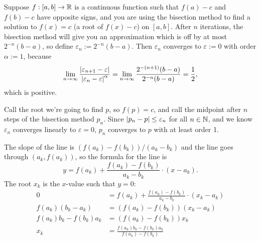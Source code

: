 \documentclass{article}
\begin{document}
\bigskip
\begin{prob}
\end{prob}
Suppose $f: [a,b] \rightarrow \mathbb{R}$ is a continuous function such that $f(a)-c$ and $f(b)-c$ have opposite signs, and you are using the bisection method to find a solution to $f(x)=c$ (a root of $f(x)-c$) on $[a,b]$. After $n$ iterations, the bisection method will give you an approximation which is off by at most $2^{-n}(b-a)$, so define $\varepsilon_n := 2^{-n}(b-a)$. Then $\varepsilon_n$ converges to $\varepsilon := 0$ with order $\alpha := 1$, because 
\[ \lim_{n \rightarrow \infty} \frac{\left\lvert \varepsilon_{n+1}-\varepsilon \right\rvert}{\left\lvert \varepsilon_n-\varepsilon \right\rvert^\alpha} = \lim_{n \rightarrow \infty} \frac{2^{-(n+1)}(b-a)}{2^{-n}(b-a)} = \frac{1}{2}, \]
which is positive.
\par
Call the root we're going to find $p$, so $f(p)=c$, and call the midpoint after $n$ steps of the bisection method $p_n$. Since $\left\lvert p_n-p \right\rvert \leq \varepsilon_n$ for all $n \in \mathbb{N}$, and we know $\varepsilon_n$ converges linearly to $\varepsilon=0$, $p_n$ converges to $p$ with at least order 1.

\bigskip
\begin{prob}
\end{prob}
The slope of the line is $(f(a_k) - f(b_k)) / (a_k - b_k)$ and the line goes through $(a_k, f(a_k))$, so the formula for the line is
\[ y = f(a_k) + \frac{f(a_k)-f(b_k)}{a_k-b_k} \cdot (x - a_k). \]
The root $x_k$ is the $x$-value such that $y=0$:
\begin{align*}
    0 &= f(a_k) + \frac{f(a_k)-f(b_k)}{a_k-b_k} \cdot (x_k - a_k) \\
    f(a_k) (b_k-a_k) &= (f(a_k)-f(b_k)) (x_k - a_k) \\
    f(a_k) b_k - f(b_k) a_k &= (f(a_k)-f(b_k)) x_k \\
    x_k &= \frac{f(a_k) b_k - f(b_k) a_k}{f(a_k)-f(b_k)}
\end{align*}
\end{document}
